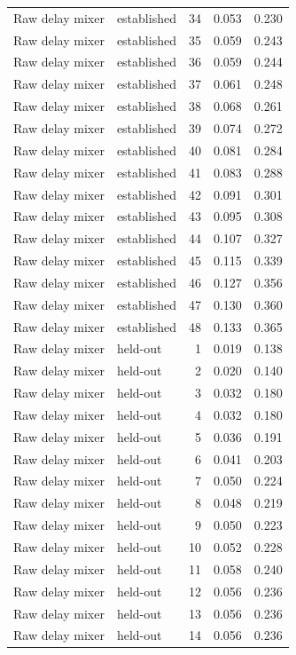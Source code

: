 \begin{tabular}{llrrr}
Raw delay mixer & established & 34 & 0.053 & 0.230 \\
Raw delay mixer & established & 35 & 0.059 & 0.243 \\
Raw delay mixer & established & 36 & 0.059 & 0.244 \\
Raw delay mixer & established & 37 & 0.061 & 0.248 \\
Raw delay mixer & established & 38 & 0.068 & 0.261 \\
Raw delay mixer & established & 39 & 0.074 & 0.272 \\
Raw delay mixer & established & 40 & 0.081 & 0.284 \\
Raw delay mixer & established & 41 & 0.083 & 0.288 \\
Raw delay mixer & established & 42 & 0.091 & 0.301 \\
Raw delay mixer & established & 43 & 0.095 & 0.308 \\
Raw delay mixer & established & 44 & 0.107 & 0.327 \\
Raw delay mixer & established & 45 & 0.115 & 0.339 \\
Raw delay mixer & established & 46 & 0.127 & 0.356 \\
Raw delay mixer & established & 47 & 0.130 & 0.360 \\
Raw delay mixer & established & 48 & 0.133 & 0.365 \\
Raw delay mixer & held-out & 1 & 0.019 & 0.138 \\
Raw delay mixer & held-out & 2 & 0.020 & 0.140 \\
Raw delay mixer & held-out & 3 & 0.032 & 0.180 \\
Raw delay mixer & held-out & 4 & 0.032 & 0.180 \\
Raw delay mixer & held-out & 5 & 0.036 & 0.191 \\
Raw delay mixer & held-out & 6 & 0.041 & 0.203 \\
Raw delay mixer & held-out & 7 & 0.050 & 0.224 \\
Raw delay mixer & held-out & 8 & 0.048 & 0.219 \\
Raw delay mixer & held-out & 9 & 0.050 & 0.223 \\
Raw delay mixer & held-out & 10 & 0.052 & 0.228 \\
Raw delay mixer & held-out & 11 & 0.058 & 0.240 \\
Raw delay mixer & held-out & 12 & 0.056 & 0.236 \\
Raw delay mixer & held-out & 13 & 0.056 & 0.236 \\
Raw delay mixer & held-out & 14 & 0.056 & 0.236 \\

\end{tabular}
